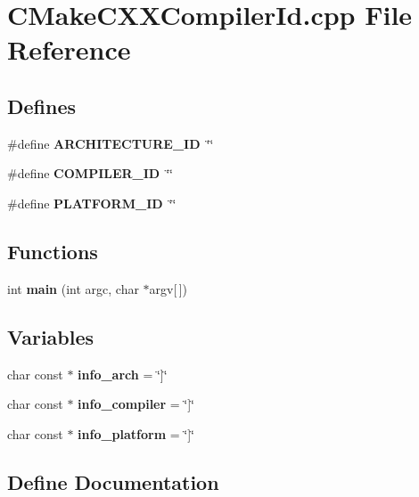 \section{\-C\-Make\-C\-X\-X\-Compiler\-Id.\-cpp \-File \-Reference}
\label{CMakeCXXCompilerId_8cpp}
\subsection*{\-Defines}
\begin{DoxyCompactItemize}
\item 
\#define {\bf \-A\-R\-C\-H\-I\-T\-E\-C\-T\-U\-R\-E\-\_\-\-I\-D}~\char`\"{}\char`\"{}
\item 
\#define {\bf \-C\-O\-M\-P\-I\-L\-E\-R\-\_\-\-I\-D}~\char`\"{}\char`\"{}
\item 
\#define {\bf \-P\-L\-A\-T\-F\-O\-R\-M\-\_\-\-I\-D}~\char`\"{}\char`\"{}
\end{DoxyCompactItemize}
\subsection*{\-Functions}
\begin{DoxyCompactItemize}
\item 
int {\bf main} (int argc, char $\ast$argv[$\,$])
\end{DoxyCompactItemize}
\subsection*{\-Variables}
\begin{DoxyCompactItemize}
\item 
char const $\ast$ {\bf info\-\_\-arch} = \char`\"{}]\char`\"{}
\item 
char const $\ast$ {\bf info\-\_\-compiler} = \char`\"{}]\char`\"{}
\item 
char const $\ast$ {\bf info\-\_\-platform} = \char`\"{}]\char`\"{}
\end{DoxyCompactItemize}


\subsection{\-Define \-Documentation}
